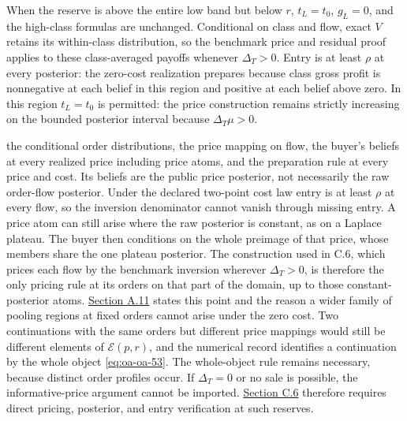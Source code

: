 
When the reserve is above the entire low band but below \(r\),
\(t_L=t_0\), \(g_L=0\), and the high-class formulas are unchanged.
Conditional on class and flow, exact \(V\) retains its within-class
distribution, so the benchmark price and residual proof applies to these
class-averaged payoffs whenever \(\Delta_T>0\). Entry is at least
\(\rho\) at every posterior: the zero-cost realization prepares because
class gross profit is nonnegative at each belief in this region and
positive at each belief above zero. In this region \(t_L=t_0\) is permitted: the price
construction remains strictly increasing on the bounded posterior
interval because \(\Delta_T\mu>0\).

the conditional order distributions, the price mapping on flow, the
buyer's beliefs at every realized price including price atoms, and the
preparation rule at every price and cost. Its beliefs are the public
price posterior, not necessarily the raw order-flow posterior. Under the
declared two-point cost law entry is at least \(\rho\) at every flow, so
the inversion denominator cannot vanish through missing entry. A price
atom can still arise where the raw posterior is constant, as on a Laplace
plateau. The buyer then conditions on the whole preimage of that price,
whose members share the one plateau posterior. The construction used in C.6,
which prices each flow by the benchmark inversion wherever
\(\Delta_T>0\), is therefore the only pricing rule at its orders on that
part of the domain, up to those constant-posterior atoms.
\hyperref[oa-a-pools]{Section A.11} states this point and the reason a wider
family of pooling regions at fixed orders cannot arise under the zero cost.
Two continuations with the same orders but different price mappings would
still be different elements of
\(\mathcal E(p,r)\), and the numerical record identifies a continuation
by the whole object \eqref{eq:oa-oa-53}. The whole-object rule remains necessary,
because distinct order profiles occur. If \(\Delta_T=0\) or no sale is possible, the informative-price argument cannot be imported.
\hyperref[oa-c-reserve]{Section C.6} therefore requires direct pricing,
posterior, and entry verification at such reserves.

